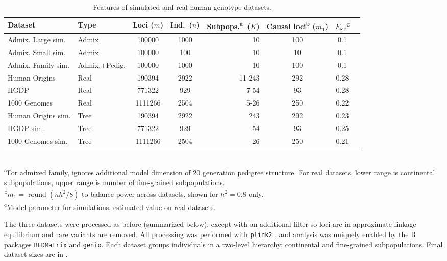 \documentclass[9pt,lineno]{elife}
\DeclareMathOperator{\round}{round}
\newcommand{\Fst}{F_{\text{ST}}}
\begin{document}
\begin{table}[bt]
  \begin{fullwidth}
    \caption{Features of simulated and real human genotype datasets.}
    \label{tab:human_sum}
    \begin{tabular}{llSSrSSS}
      \toprule
      Dataset & Type & {Loci ($m$)} & {Ind.~($n$)} & {Subpops.\textsuperscript{a}~($K$)} & {Causal loci\textsuperscript{b} ($m_1$)} & $\Fst$\textsuperscript{c} \\
      \midrule
      Admix. Large sim.	&Admix.		&100000		&1000	&10	&100	&0.1 \\
      Admix. Small sim.	&Admix.		&100000		&100	&10	&10	&0.1 \\
      Admix. Family sim.	&Admix.+Pedig.	&100000		&1000	&10	&100	&0.1 \\
      Human Origins	&Real		&190394		&2922	&11-243	&292	&0.28 \\
      HGDP		&Real		&771322		&929	&7-54	&93	&0.28 \\
      1000 Genomes	&Real		&1111266	&2504	&5-26	&250	&0.22 \\
      Human Origins sim.	&Tree		&190394		&2922	&243	&292	&0.23 \\
      HGDP sim.		&Tree		&771322		&929	&54	&93	&0.25 \\
      1000 Genomes sim.	&Tree		&1111266	&2504	&26	&250	&0.21 \\
      \bottomrule
    \end{tabular}
    \\
    \textsuperscript{a}For admixed family, ignores additional model dimension of 20 generation pedigree structure.
    For real datasets, lower range is continental subpopulations, upper range is number of fine-grained subpopulations.\\
    \textsuperscript{b}$m_1 = \round( n h^2 / 8 )$ to balance power across datasets, shown for $h^2=0.8$ only.\\
    \textsuperscript{c}Model parameter for simulations, estimated value on real datasets.
  \end{fullwidth}
\end{table}

The three datasets were processed as before \citep{ochoa_new_2019} (summarized below), except with an additional filter so loci are in approximate linkage equilibrium and rare variants are removed.
All processing was performed with \texttt{plink2} \citep{chang_second-generation_2015}, and analysis was uniquely enabled by the R packages \texttt{BEDMatrix} \citep{grueneberg_bgdata_2019} and \texttt{genio}.
Each dataset groups individuals in a two-level hierarchy: continental and fine-grained subpopulations.
Final dataset sizes are in .
\end{document}
